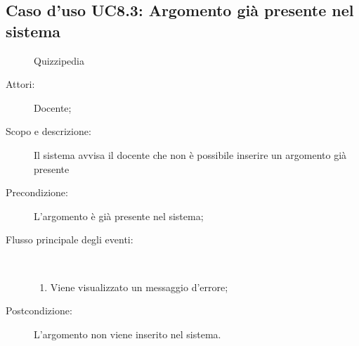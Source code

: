 \subsection{Caso d'uso UC8.3: Argomento già presente nel sistema}
	\begin{figure}[H]
		\centering
		\begin{resizedtikzpicture}{\textwidth}
		\begin{umlsystem}[x=0, fill=lightgray!20]{Quizzipedia}
		\end{umlsystem}
		\end{resizedtikzpicture}
		\caption{}
	\end{figure}
\begin{description}
\item[Attori:] Docente;
\item[Scopo e descrizione:] Il sistema avvisa il docente che non è possibile inserire un argomento già presente
      \item[Precondizione:] L'argomento è già presente nel sistema;

        \item[Flusso principale degli eventi:] \ 
 \begin{enumerate}
          \item Viene visualizzato un messaggio d'errore;

      \end{enumerate}
    \item[Postcondizione:] L'argomento non viene inserito nel sistema.
  \end{description}
\hypertarget{UC8.4}{}
